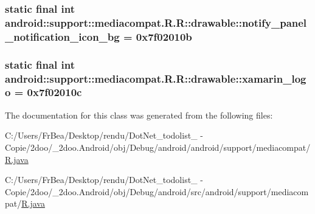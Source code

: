 \hypertarget{classandroid_1_1support_1_1mediacompat_1_1_r_1_1drawable_854bd3b995a1364cb3a971c952c19fe0}{
\subsubsection[{notify\_\-panel\_\-notification\_\-icon\_\-bg}]{\setlength{\rightskip}{0pt plus 5cm}static final int android::support::mediacompat.R.R::drawable::notify\_\-panel\_\-notification\_\-icon\_\-bg = 0x7f02010b}}
\label{classandroid_1_1support_1_1mediacompat_1_1_r_1_1drawable_854bd3b995a1364cb3a971c952c19fe0}


\hypertarget{classandroid_1_1support_1_1mediacompat_1_1_r_1_1drawable_82d03b8a5a43623df9fafe07e4b904d8}{
\subsubsection[{xamarin\_\-logo}]{\setlength{\rightskip}{0pt plus 5cm}static final int android::support::mediacompat.R.R::drawable::xamarin\_\-logo = 0x7f02010c}}
\label{classandroid_1_1support_1_1mediacompat_1_1_r_1_1drawable_82d03b8a5a43623df9fafe07e4b904d8}




The documentation for this class was generated from the following files:\begin{CompactItemize}
\item 
C:/Users/FrBea/Desktop/rendu/DotNet\_\-todolist\_ - Copie/2doo/\_\-2doo.Android/obj/Debug/android/android/support/mediacompat/\hyperlink{android_2support_2mediacompat_2_r_8java}{R.java}\item 
C:/Users/FrBea/Desktop/rendu/DotNet\_\-todolist\_ - Copie/2doo/\_\-2doo.Android/obj/Debug/android/src/android/support/mediacompat/\hyperlink{src_2android_2support_2mediacompat_2_r_8java}{R.java}\end{CompactItemize}
